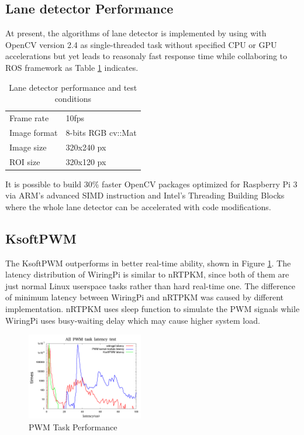 \documentclass[conference]{IEEEtran}
\begin{document}
\subsection{Lane detector Performance}

At present, the algorithms of lane detector is implemented by using with OpenCV version 2.4 as single-threaded task without specified CPU or GPU accelerations but yet leads to reasonaly fast response time while collaboring to ROS framework as Table \ref{lane_detector_condition} indicates.

\begin{table}[!htbp]
	\centering
	\caption{Lane detector performance and test conditions}
	\label{lane_detector_condition}
	\begin{tabular}{ll}
		Frame rate                      &10fps \\
		Image format                    &8-bits RGB cv::Mat \\
		Image size                      &320x240 px	 \\	
		ROI size                        &320x120 px
	\end{tabular}
\end{table}

It is possible to build 30\% faster OpenCV packages \cite{faster-opencv} optimized for Raspberry Pi 3 via ARM's advanced SIMD instruction \cite{arm-neon} and Intel's Threading Building Blocks \cite{intel-tbb} where the whole lane detector can be accelerated with code modifications.

\subsection{KsoftPWM}

The KsoftPWM outperforms in better real-time ability, shown in Figure \ref{fig:ksoftpwm_perf}. The latency distribution of WiringPi is similar to nRTPKM, since both of them are just normal Linux userspace tasks rather than hard real-time one. The difference of minimum latency between WiringPi and nRTPKM was caused by different implementation. nRTPKM uses sleep function to simulate the PWM signals while WiringPi uses busy-waiting delay which may cause higher system load.

\begin{figure}
	\centering
	\includegraphics[width=2in]{img/ksoftpwm_load.png}
	\caption{PWM Task Performance}
	\label{fig:ksoftpwm_perf}
\end{figure}
\end{document}
